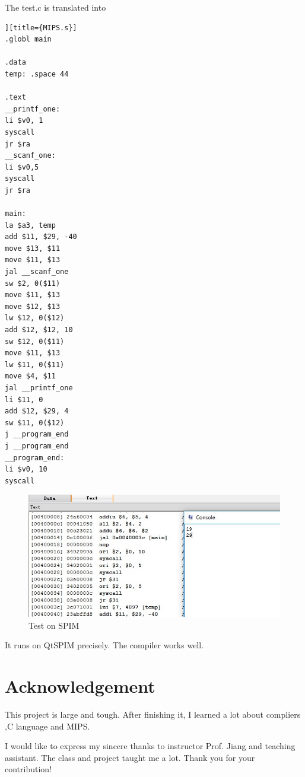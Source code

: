 \documentclass{article}
\begin{document}
The test.c is translated into 
\begin{lstlisting}][title={MIPS.s}] 
.globl main

.data
temp: .space 44

.text
__printf_one:
li $v0, 1
syscall
jr $ra
__scanf_one:
li $v0,5
syscall
jr $ra

main:
la $a3, temp
add $11, $29, -40
move $13, $11
move $11, $13
jal __scanf_one
sw $2, 0($11)
move $11, $13
move $12, $13
lw $12, 0($12)
add $12, $12, 10
sw $12, 0($11)
move $11, $13
lw $11, 0($11)
move $4, $11
jal __printf_one
li $11, 0
add $12, $29, 4
sw $11, 0($12)
j __program_end
j __program_end
__program_end:
li $v0, 10
syscall

\end{lstlisting}
\begin{figure}[h]
\begin{center}
\includegraphics[width=1\textwidth]{SPIM.jpg} %
\caption{Test on SPIM}
\end{center}
\end{figure}
It runs on QtSPIM precisely. The compiler works well.

\section{Acknowledgement}

This project is large and tough. After finishing it, I learned a lot about compliers ,C language and MIPS. 

I would like to express my sincere thanks to instructor Prof. Jiang and teaching assistant. The class and project taught me a lot. Thank you for your contribution!








\end{document}
